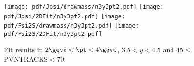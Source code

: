 \begin{figure}[H]
\begin{center}
\texttt{[image: pdf/Jpsi/drawmass/n3y3pt2.pdf]}
\texttt{[image: pdf/Jpsi/2DFit/n3y3pt2.pdf]}
\vspace*{-0.5cm}
\texttt{[image: pdf/Psi2S/drawmass/n3y3pt2.pdf]}
\texttt{[image: pdf/Psi2S/2DFit/n3y3pt2.pdf]}
\vspace*{-0.5cm}
\end{center}
\caption{Fit results in $2\gevc<\pt<4\gevc$, $3.5<y<4.5$ and 45$\leq$PVNTRACKS$<$70.}
\label{Fitn3y3pt2}
\end{figure}
